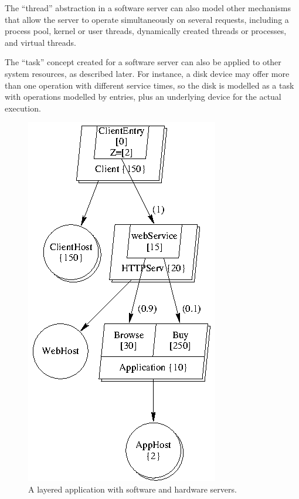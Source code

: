 \documentclass[11pt]{article}
\begin{document}
The ``thread'' abstraction in a software server can also model other mechanisms that allow the
server to operate simultaneously on several requests, including a process pool, kernel or user
threads, dynamically created threads or processes, and virtual threads.

The ``task'' concept created for a software server can also be applied to other system resources,
as described later. For instance, a disk device may offer more than one operation with different
service times, so the disk is modelled as a task with operations modelled by entries, plus an
underlying device for the actual execution.

\begin{figure}
  \centering
  \includegraphics{model/notation.eps}
  \caption{A layered application with software and hardware servers.}
  \label{fig:notation}
\end{figure}
\end{document}
